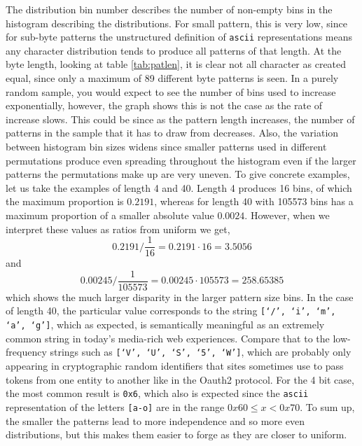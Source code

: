 \documentclass[ %
                    author={Samuel Russell},
                supervisor={Prof. Bogdan Warinschi},
                    degree={MEng},
                     title={Innocuous Ciphertexts},
                  subtitle={The DE-CENSOR Scheme},
                      type={Research},
                      year={2018} ]{dissertation}
\begin{document}
The distribution bin number describes the number of non-empty bins in the histogram describing the distributions.
For small pattern, this is very low, since for sub-byte patterns the unstructured definition of \texttt{ascii} representations means any character distribution tends to produce all patterns of that length.
At the byte length, looking at table \ref{tab:patlen}, it is clear not all character as created equal, since only a maximum of 89 different byte patterns is seen.
In a purely random sample, you would expect to see the number of bins used to increase exponentially, however, the graph shows this is not the case as the rate of increase slows.
This could be since as the pattern length increases, the number of patterns in the sample that it has to draw from decreases.
Also, the variation between histogram bin sizes widens since smaller patterns used in different permutations produce even spreading throughout the histogram even if the larger patterns the permutations make up are very uneven.
To give concrete examples, let us take the examples of length 4 and 40.
Length 4 produces 16 bins, of which the maximum proportion is $0.2191$, whereas for length 40 with 105573 bins has a maximum proportion of a smaller absolute value $0.0024$.
However, when we interpret these values as ratios from uniform we get,
$$0.2191 / {\frac{1}{16}} = 0.2191 \cdot 16 = 3.5056$$
and
$${0.00245} / {\frac{1}{105573}} = 0.00245 \cdot 105573 = 258.65385$$
which shows the much larger disparity in the larger pattern size bins.
In the case of length 40, the particular value corresponds to the string \texttt{[`/', `i', `m', `a', `g']}, which as expected, is semantically meaningful as an extremely common string in today's media-rich web experiences. Compare that to the low-frequency strings such as \texttt{[`V', `U', `S', `5', `W']}, which are probably only appearing in cryptographic random identifiers that sites sometimes use to pass tokens from one entity to another like in the Oauth2 protocol.
For the 4 bit case, the most common result is \texttt{0x6}, which also is expected since the \texttt{ascii} representation of the letters \texttt{[a-o]} are in the range $0x60 \leq x < 0x70$.
To sum up, the smaller the patterns lead to more independence and so more even distributions, but this makes them easier to forge as they are closer to uniform.
\end{document}
